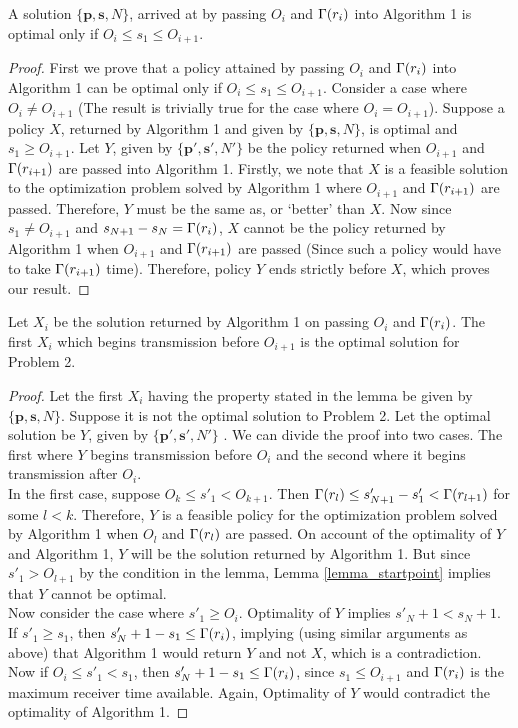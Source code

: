 \begin{lemma}
A solution $\{\bm{p},\bm{s},N\}$, arrived at by passing $O_i$ and $\Gamma(r_i)$ into Algorithm 1 is optimal only if $O_i\leq s_1\leq O_{i+1}$.
\label{lemma_startpoint}
\end{lemma}
\begin{proof}
First we prove that a policy attained by passing $O_i$ and $\Gamma(r_i)$ into Algorithm 1 can be optimal only if $O_i\leq s_1\leq O_{i+1}$. Consider a case where $O_i \neq O_{i+1}$ (The result is trivially true for the case where $O_i = O_{i+1}$). Suppose a policy $X$, returned by Algorithm 1 and given by $\{\bm{p},\bm{s},N\}$, is optimal and $s_1 \ge O_{i+1}$. Let $Y$, given by $\{\bm{p'},\bm{s'},N'\}$ be the policy returned when $O_{i+1}$ and $\Gamma(r_{i+1})$ are passed into Algorithm 1. Firstly, we note that $X$ is a feasible solution to the optimization problem solved by Algorithm 1 where $O_{i+1}$ and $\Gamma(r_{i+1})$ are passed. Therefore, $Y$ must be the same as, or `better' than $X$. Now since $s_1 \neq O_{i+1}$ and $s_{N+1} - s_{N} = \Gamma(r_i)$, $X$ cannot be the policy returned by Algorithm 1 when $O_{i+1}$ and $\Gamma(r_{i+1})$ are passed (Since such a policy would have to take $\Gamma(r_{i+1})$ time). Therefore, policy $Y$ ends strictly before $X$, which proves our result. 
\end{proof}
\begin{lemma}
\label{lemma_first_solution}
Let $X_i$ be the solution returned by Algorithm 1 on passing $O_i$ and $\Gamma(r_i)$. The first $X_i$ which begins transmission before $O_{i+1}$ is the optimal solution for Problem 2.
\end{lemma}
\begin{proof}
Let the first $X_i$ having the property stated in the lemma be given by $\{\bm{p},\bm{s},N\}$. Suppose it is not the optimal solution to Problem 2. Let the optimal solution be $Y$, given by  $\{\bm{p'},\bm{s'},N'\}$ . We can divide the proof into two cases. The first where $Y$ begins transmission before $O_i$ and the second where it begins transmission after $O_i$.\\ In the first case, suppose $O_{k}\le s'_1 < O_{k+1}$. Then $\Gamma(r_{l})\le s'_{N+1} - s'_1 <\Gamma(r_{l+1})$ for some $l<k$. Therefore, $Y$ is a feasible policy for the optimization problem solved by Algorithm 1 when $O_l$ and $\Gamma(r_l)$ are passed. On account of the optimality of $Y$ and Algorithm 1, $Y$ will be the solution returned by Algorithm 1. But since $s'_1 > O_{l+1}$ by the condition in the lemma, Lemma \ref{lemma_startpoint} implies that $Y$ cannot be optimal.\\
Now consider the case where $s'_1\ge O_i$. Optimality of $Y$ implies $s'_N+1<s_N+1$. If $s'_1\ge s_1$, then $s'_N+1-s_1\le \Gamma(r_i)$, implying (using similar arguments as above) that Algorithm 1 would return $Y$ and not $X$, which is a contradiction. Now if $O_i\le s'_1<s_1$, then $s'_N+1-s_1\le \Gamma(r_i)$, since $s_1\le O_{i+1}$ and $\Gamma(r_i)$ is the maximum receiver time available. Again, Optimality of $Y$ would contradict the optimality of Algorithm 1.
\end{proof} 

